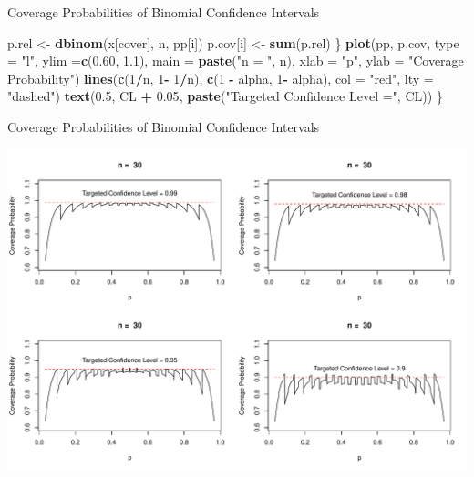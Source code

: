 \documentclass[
  ignorenonframetext,
]{beamer}
\newenvironment{Shaded}{\begin{snugshade}}{\end{snugshade}}
\newcommand{\AttributeTok}[1]{\textcolor[rgb]{0.13,0.29,0.53}{#1}}
\newcommand{\DecValTok}[1]{\textcolor[rgb]{0.00,0.00,0.81}{#1}}
\newcommand{\FloatTok}[1]{\textcolor[rgb]{0.00,0.00,0.81}{#1}}
\newcommand{\FunctionTok}[1]{\textcolor[rgb]{0.13,0.29,0.53}{\textbf{#1}}}
\newcommand{\NormalTok}[1]{#1}
\newcommand{\OtherTok}[1]{\textcolor[rgb]{0.56,0.35,0.01}{#1}}
\newcommand{\SpecialCharTok}[1]{\textcolor[rgb]{0.81,0.36,0.00}{\textbf{#1}}}
\newcommand{\StringTok}[1]{\textcolor[rgb]{0.31,0.60,0.02}{#1}}
\begin{document}
\begin{frame}[fragile]{Coverage Probabilities of Binomial Confidence
Intervals}
\begin{Shaded}
\begin{Highlighting}[]
\NormalTok{  p.rel }\OtherTok{\textless{}{-}} \FunctionTok{dbinom}\NormalTok{(x[cover], n, pp[i])}
\NormalTok{  p.cov[i] }\OtherTok{\textless{}{-}} \FunctionTok{sum}\NormalTok{(p.rel)}
\NormalTok{\}}
\FunctionTok{plot}\NormalTok{(pp, p.cov, }\AttributeTok{type =} \StringTok{"l"}\NormalTok{, }\AttributeTok{ylim =}\FunctionTok{c}\NormalTok{(}\FloatTok{0.60}\NormalTok{, }\FloatTok{1.1}\NormalTok{), }\AttributeTok{main =} \FunctionTok{paste}\NormalTok{(}\StringTok{"n = "}\NormalTok{, n), }
     \AttributeTok{xlab =} \StringTok{"p"}\NormalTok{, }\AttributeTok{ylab =} \StringTok{"Coverage Probability"}\NormalTok{)}
\FunctionTok{lines}\NormalTok{(}\FunctionTok{c}\NormalTok{(}\DecValTok{1}\SpecialCharTok{/}\NormalTok{n, }\DecValTok{1}\SpecialCharTok{{-}} \DecValTok{1}\SpecialCharTok{/}\NormalTok{n), }\FunctionTok{c}\NormalTok{(}\DecValTok{1} \SpecialCharTok{{-}}\NormalTok{ alpha, }\DecValTok{1}\SpecialCharTok{{-}}\NormalTok{ alpha), }\AttributeTok{col =} \StringTok{"red"}\NormalTok{, }\AttributeTok{lty =} \StringTok{"dashed"}\NormalTok{)}
      \FunctionTok{text}\NormalTok{(}\FloatTok{0.5}\NormalTok{, CL }\SpecialCharTok{+} \FloatTok{0.05}\NormalTok{, }\FunctionTok{paste}\NormalTok{(}\StringTok{"Targeted Confidence Level ="}\NormalTok{, CL))}
\NormalTok{\}}
\end{Highlighting}
\end{Shaded}

\normalsize
\end{frame}

\begin{frame}{Coverage Probabilities of Binomial Confidence Intervals}
\protect\hypertarget{coverage-probabilities-of-binomial-confidence-intervals-6}{}
\tiny

\begin{center}\includegraphics[width=0.9\linewidth,height=0.8\textheight]{Week11_12_13_files/figure-beamer/unnamed-chunk-17-1} \end{center}
\normalsize
\end{frame}
\end{document}
